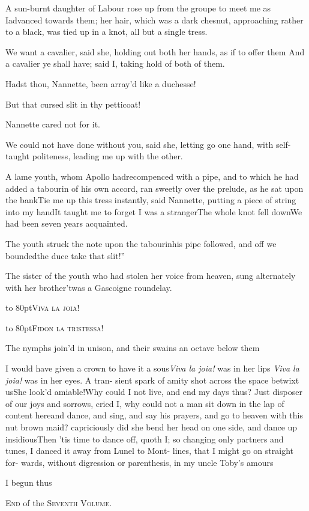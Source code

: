 \documentclass{article}
\begin{document}
A sun-burnt daughter of Labour rose up from the groupe to meet
me as I\break advanced towards them; her hair, which was a dark
chesnut,
approaching rather to a black, was tied up in a knot, all but a
single tress.

We want a cavalier, said she, holding out both her hands, as if
to offer them\tsk{}
And a cavalier ye shall have; said I, taking
hold of both of them.

Hadst thou, Nannette, been array’d like a
duchesse!

\tsh But that cursed slit in thy petticoat!

Nannette cared not for it.

We could not have done without you, said she, letting go one
hand, with self-taught politeness, leading me up with the
other.

A lame youth, whom Apollo had\break recompenced with a pipe, and
to which he had added a tabourin of his own accord, ran sweetly
over the prelude, as he sat upon the bank\tsh Tie me up this
tress instantly, said Nannette, putting a piece of string into
my hand\tsk It taught me to forget I was a stranger\tsh The
whole knot fell down\tsh We had been seven years acquainted.

The youth struck the note upon the tabourin\tsk his pipe
followed, and off we bounded\tsh \lqq the duce
take that slit!”

The sister of the youth who had stolen her voice from heaven,
sung alternately with her brother\tsh ’twas a
Gascoigne roundelay.

\centerline{\hbox to 80pt{\textsc{Viva la joia}!\hss}}
\centerline{\hbox to 80pt{\textsc{Fidon la tristessa}!\hss}}

\vskip-10pt

\noindent
The nymphs join’d in unison, and their swains an octave below them\tsh

I would have given a crown to have it\break
{}\break
a sous\tsk \textit{Viva la joia!} was in her lips\tsk\break
\textit{Viva la joia!} was in her eyes. A tran-
sient spark of amity shot across the space betwixt us\tsh She
look’d amiable!\tsh Why could I not live, and end my days thus?
Just disposer of our joys and sorrows, cried I, why could not a
man sit down in the lap of content here\tsh and dance, and sing,
and say his prayers, and go to heaven with this nut brown maid?
capriciously did she bend her head on one side, and dance up
insidious\tsh\break Then ’tis time to dance off, quoth I; so changing
only partners and tunes, I danced it away from Lunel to
Mont-\break
{}
lines, that I might go on straight for-
wards, without digression or parenthesis, in my uncle Toby’s
amours\tsh

I begun thus\tsh

\vskip 140pt

\centerline{\textsc{End} of the \textsc{Seventh Volume}.}
\end{document}

